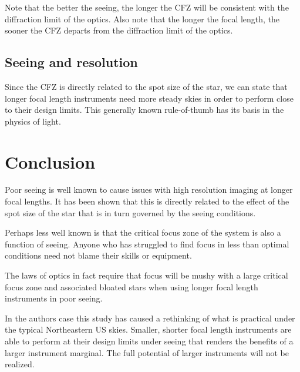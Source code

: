 \documentclass[11pt]{article}
\begin{document}
Note that the better the seeing, the longer the CFZ will be consistent with the diffraction limit of the optics.  Also note that the longer the focal length, the sooner the CFZ departs from the diffraction limit of the optics.  

\subsection{Seeing and resolution}

Since the CFZ is directly related to the spot size of the star, we can state that longer focal length instruments need more steady skies in order to perform close to their design limits. This generally known rule-of-thumb has its basis in the physics of light.

\section{Conclusion}

Poor seeing is well known to cause issues with high resolution imaging at longer focal lengths.  It has been shown that this is directly related to the effect of the spot size of the star that is in turn governed by the seeing conditions.

Perhaps less well known is that the critical focus zone of the system is also a function of seeing.  Anyone who has struggled to find focus in less than optimal conditions need not blame their skills or  equipment.  

The laws of optics in fact require that focus will be mushy with a large critical focus zone and associated bloated stars when using longer focal length instruments in poor seeing.

In the authors case this study has caused a rethinking of what is practical under the typical Northeastern US skies.  Smaller, shorter focal length instruments are able to perform at their design limits under seeing that renders the benefits of a larger instrument marginal.  The full potential of larger instruments will not be realized.
\end{document}

